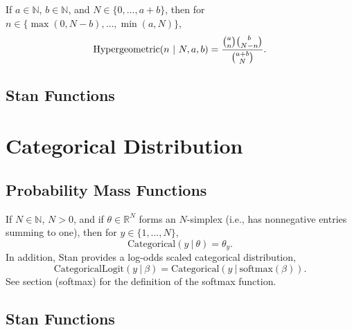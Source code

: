 \begin{description}
{\begin{description}
If $a \in \mathbb{N}$, $b \in \mathbb{N}$, and $N \in \{0,\ldots,a+b\}$, then for $n \in \{\max(0,N-b),\ldots,\min(a,N)\}$, \[ \text{Hypergeometric}(n~|~N,a,b) = \frac{\normalsize{\binom{a}{n} \binom{b}{N - n}}}      {\normalsize{\binom{a + b}{N}}}. \] 



\subsection{Stan Functions}


\begin{description}    \end{description}


\begin{description}  \end{description}


\section{Categorical Distribution}\label{categorical-distribution.section}


\subsection{Probability Mass Functions}


If $N \in \mathbb{N}$, $N > 0$, and if $\theta \in \mathbb{R}^N$ forms an $N$-simplex (i.e., has nonnegative entries summing to one), then for $y \in \{1,\ldots,N\}$, \[ \text{Categorical}(y~|~\theta) = \theta_y. \] In addition, Stan provides a log-odds scaled categorical distribution, \[ \text{CategoricalLogit}(y~|~\beta) = \text{Categorical}(y~|~\text{softmax}(\beta)). \] See section \@ref(softmax) for the definition of the softmax function.


 


\subsection{Stan Functions}



\end{description}}
\end{description}
